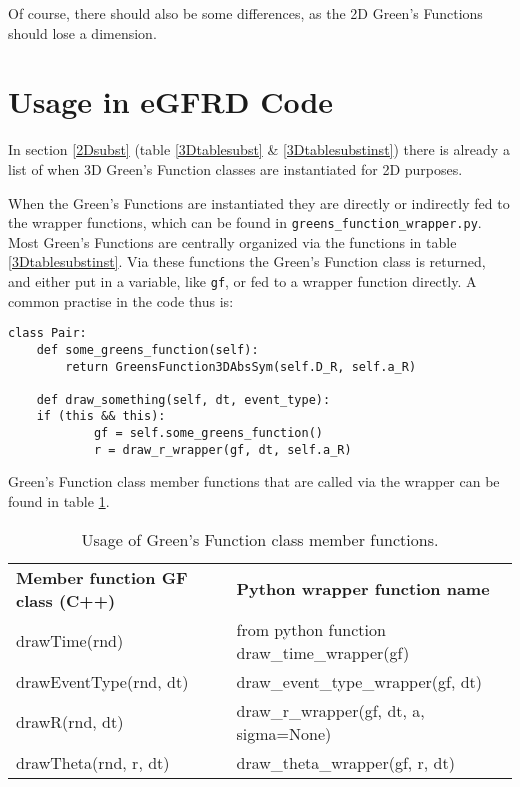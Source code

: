 \documentclass[a4paper,10pt]{article}
\begin{document}
Of course, there should also be some differences, as the 2D Green's Functions should lose a dimension. 

\section{Usage in eGFRD Code}
\label{2Dsubstusage}

In section \ref{2Dsubst} (table \ref{3Dtablesubst} \& \ref{3Dtablesubstinst}) there is already a list of when 3D Green's Function classes are instantiated for 2D purposes. 

When the Green's Functions are instantiated they are directly or indirectly fed to the wrapper functions, which can be found in \verb|greens_function_wrapper.py|. Most Green's Functions are centrally organized via the functions in table \ref{3Dtablesubstinst}. Via these functions the Green's Function class is returned, and either put in a variable, like \verb|gf|, or fed to a wrapper function directly. A common practise in the code thus is:

\begin{verbatim}
class Pair:
    def some_greens_function(self):
        return GreensFunction3DAbsSym(self.D_R, self.a_R)

    def draw_something(self, dt, event_type):
	if (this && this):
            gf = self.some_greens_function()
            r = draw_r_wrapper(gf, dt, self.a_R)
\end{verbatim}

Green's Function class member functions that are called via the wrapper can be found in table \ref{table:gfwrapper}.

\begin{table}[h!]
\caption{Usage of Green's Function class member functions.}
\label{table:gfwrapper}
\begin{tabular}{ p{} p{} }
 \textbf{Member function GF class (C++)} & \textbf{Python wrapper function name} \\
 drawTime(rnd) & from python function draw\_time\_wrapper(gf) \\
 drawEventType(rnd, dt) & draw\_event\_type\_wrapper(gf, dt) \\
 drawR(rnd, dt) & draw\_r\_wrapper(gf, dt, a, sigma=None) \\
 drawTheta(rnd, r, dt) & draw\_theta\_wrapper(gf, r, dt) \\
\end{tabular}
\end{table}
\end{document}
